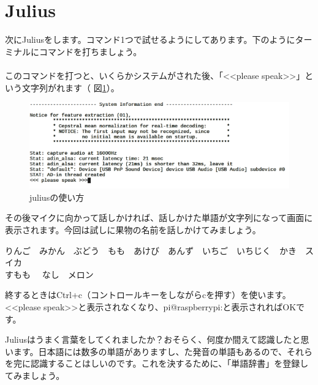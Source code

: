 \section{Julius}\label{Julius}
次にJuliusをします。コマンド1つで試せるようにしてあります。下のようにターミナルにコマンドを打ちましょう。\\
\\
このコマンドを打つと、いくらかシステムがされた後、「<<please speak>>」という文字列がれます（ 図\ref{juliusの使い方}）。

\begin{figure}[H]
\begin{center}
    \includegraphics[width=\linewidth]{images/chap06/text06-img009.png}
    \caption{juliusの使い方}
    \label{juliusの使い方}
\end{center}
\end{figure}

その後マイクに向かって話しかければ、話しかけた単語が文字列になって画面に表示されます。今回は試しに果物の名前を話しかけてみましょう。
\begin{center}
	りんご　みかん　ぶどう　もも　あけび　あんず　いちご　いちじく　かき　スイカ\\すもも　	なし　メロン
\end{center}
	
終するときはCtrl+c（コントロールキーをしながらcを押す）を使います。<<please speak>>と表示されなくなり、pi@raspberrypi:と表示されればOKです。

Juliusはうまく言葉をしてくれましたか？おそらく、何度か間えて認識したと思います。日本語には数多の単語がありますし、た発音の単語もあるので、それらを完に認識することはしいのです。これを決するために、「単語辞書」を登録してみましょう。\\

\begin{tcolorbox}[title=\useOmetoi]
\begin{enumerate}
\end{enumerate}
\end{tcolorbox}
